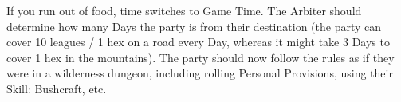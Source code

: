 \vspace{90mm}


  If you run out of food, time switches to Game Time.  The Arbiter should determine how many Days the party is from their destination (the party can cover 10 leagues / 1 hex on a road every Day, whereas it might take 3 Days to cover 1 hex in the mountains).  The party should now follow the rules as if they were in a wilderness dungeon, including rolling Personal Provisions, using their Skill: Bushcraft, etc. 

